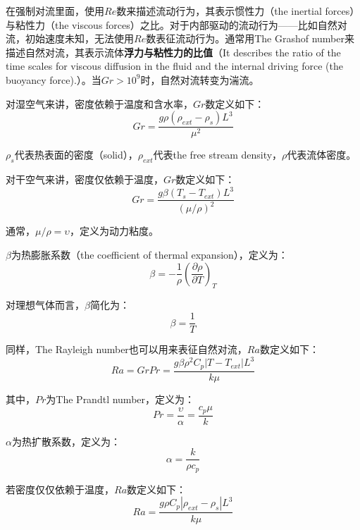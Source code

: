 在强制对流里面，使用$Re$数来描述流动行为，其表示惯性力（the inertial
forces）与粘性力（the viscous forces）之比。对于内部驱动的流动行为——比如自然对流，初始速度未知，无法使用$Re$数表征流动行为。通常用The Grashof number来描述自然对流，其表示流体\textbf{浮力与粘性力的比值}（It describes the ratio of the time scales for viscous diffusion in the fluid and the internal driving force (the buoyancy force).）。当$Gr>10^9$时，自然对流转变为湍流。

对湿空气来讲，密度依赖于温度和含水率，$Gr$数定义如下：
\begin{equation}
    Gr = \frac{g\rho (\rho_{ext} - \rho_s) L^3}{\mu^2}
\end{equation}

$\rho_s$代表热表面的密度（solid），$\rho_{ext}$代表the free stream density，$\rho$代表流体密度。

对干空气来讲，密度仅依赖于温度，$Gr$数定义如下：
\begin{equation}
    Gr = \frac{g\beta (T_s - T_{ext})L^3}{(\mu/\rho)^2}
\end{equation}

通常，$\mu/\rho=\upsilon$，定义为动力粘度。

$\beta$为热膨胀系数（the coefficient of thermal expansion），定义为：
\begin{equation}
    \beta = -\frac{1}{\rho} \left( \frac{\partial \rho}{\partial T} \right)_T
\end{equation}

对理想气体而言，$\beta$简化为：
\begin{equation}
    \beta = \frac{1}{T}
\end{equation}

同样，The Rayleigh number也可以用来表征自然对流，$Ra$数定义如下：
\begin{equation}
    Ra = GrPr =\frac{g\beta\rho^2 C_p |T-T_{ext}|L^3}{k\mu}
\end{equation}

其中，$Pr$为The Prandtl number，定义为：
\begin{equation}
    Pr = \frac{\upsilon}{\alpha} = \frac{c_p\mu}{k}
\end{equation}

$\alpha$为热扩散系数，定义为：
\begin{equation}
    \alpha = \frac{k}{\rho c_p}
\end{equation}

若密度仅仅依赖于温度，$Ra$数定义如下：
\begin{equation}
    Ra = \frac{g\rho C_p |\rho_{ext}-\rho_s|L^3}{k\mu}
\end{equation}

